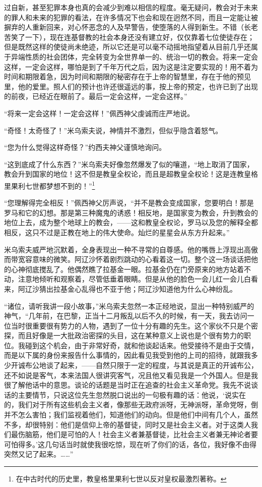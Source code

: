 过自新，甚至犯罪本身也真的会减少到难以相信的程度。毫无疑问，教会对于未来的罪人和未来的犯罪的看法，在许多情况下也会和现在迥然不同，而且一定能让被摒弃的人重新回来，对心怀恶念的人及早警告，使堕落的人得到新生。不错（长老苦笑了一下），现在连基督教的社会本身还没有建立好，仅仅靠着七位使徒存在；但是既然这样的使徒尚未绝迹，所以它还是可以毫不动摇地指望着从目前几乎还属于异端性质的社会团体，完全转变为全世界单一的、统治一切的教会。将来一定会这样，一定会这样，哪怕是到了千年万代之后，因为这是注定要实现的！用不着为时间和期限着急，因为时间和期限的秘密存在于上帝的智慧里，存在于他的预见里，他的爱里。照人们的预计也许还很遥远的事，按上帝的预定，也许已到了出现的前夜，已经近在眼前了。最后一定会这样，一定会这样。”
\par “将来一定会这样！一定会这样！”佩西神父虔诚而庄严地说。
\par “奇怪！太奇怪了！”米乌索夫说，神情并不激烈，但似乎隐含着怒气。
\par “您为什么觉得这样奇怪？”约西夫神父谨慎地询问。
\par “这到底成了什么东西？”米乌索夫好像忽然爆发了似的嚷道，“地上取消了国家，教会升到国家的地位！这不但是教皇全权论，而且是超教皇全权论！这是连教皇格里果利七世都梦想不到的！”\footnote{在中古时代的历史里，教皇格里果利七世以反对皇权最激烈著称。}
\par “您理解得完全相反！”佩西神父厉声说，“并不是教会变成国家，您要明白！那是罗马和它的幻想。那是第三种魔鬼的诱惑！相反地，是国家变为教会，升到教会的地位上去，成为整个地球上的教会，——这和教皇全权论，罗马以及您的解释全都相反，这只不过是正教在地上的伟大使命。灿烂的星星会从东方升起来。”
\par 米乌索夫威严地沉默着，全身表现出一种不寻常的自尊感。他的嘴唇上浮现出高傲而带宽容意味的微笑。阿辽沙怀着剧烈跳动的心看着这一切。整个这一场谈话把他的心神彻底搅乱了。他偶然瞧了拉基金一眼。拉基金仍在门旁原来的地方站着不动，注意地倾听和观察着，尽管低垂着眼睛。但是从他的脸色一会儿红一会儿白看来，阿辽沙猜出拉基金心乱得也不亚于他；阿辽沙知道他为什么心神纷乱。
\par “诸位，请听我讲一段小故事，”米乌索夫忽然一本正经地说，显出一种特别威严的神气，“几年前，在巴黎，正当十二月叛乱以后不久的时候，有一天，我去访问一位当时很重要很有势力的人物，遇到了一位十分有趣的先生。这个家伙不只是个密探，而且好像是一大批政治密探的头目，这在某种意义上说也是个很有势力的职位。我碰到这个机会，由于非常好奇，就和他谈起话来。他受接待不是由于交情，而是以下属的身份来报告什么事情的，因此看见我受到他的上司的招待，就跟我多少开诚布公地谈了起来，——自然只限于一定的程度，与其说是真正的开诚布公，还不如说是客气，本来法国人很讲究客气，况且他又看见我是一个外国人。但是我很了解他话中的意思。谈论的话题是当时正在追查的社会主义革命党。我先不说谈话的主要情节，只说这位先生忽然脱口说出的一句极有趣的话：他说，‘说实在的，我们对于所有这些机会主义者，像那些无政府派呀，无神派呀，革命党呀，倒并不怎么害怕；我们监视着他们，知道他们的动向。但是他们中间有几个人，虽然不多，却很特别：他们是信仰上帝的基督徒，同时又是社会主义者。对于这类人我们最伤脑筋，他们是可怕的人！社会主义者兼基督徒，比社会主义者兼无神论者要可怕得多。’这几句话当时就使我很吃惊，现在听了你们的话，各位，我好像不由得突然又记了起来。……”

